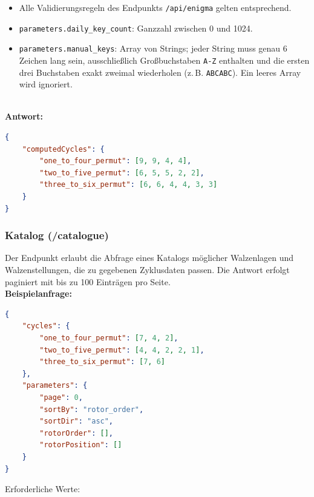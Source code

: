 \documentclass[12pt, ngerman, a4paper, numbers=noenddot]{article}
\begin{document}
\begin{itemize}
	\item Alle Validierungsregeln des Endpunkts \lstinline|/api/enigma| gelten entsprechend.
	\item \lstinline|parameters.daily_key_count|: Ganzzahl zwischen 0 und 1024.
	\item \lstinline|parameters.manual_keys|: Array von Strings; jeder String muss genau 6 Zeichen lang sein, ausschließlich Großbuchstaben \lstinline|A-Z| enthalten und die ersten drei Buchstaben exakt zweimal wiederholen (z.\,B. \lstinline|ABCABC|). Ein leeres Array wird ignoriert.
\end{itemize}
\ \\
\textbf{Antwort:}
\begin{lstlisting}[language=json, caption={Antwort auf /cyclometer-Anfrage}]
{
	"computedCycles": {
		"one_to_four_permut": [9, 9, 4, 4],
		"two_to_five_permut": [6, 5, 5, 2, 2],
		"three_to_six_permut": [6, 6, 4, 4, 3, 3]
	}
}
\end{lstlisting}



\subsubsection{Katalog (/catalogue)}

Der Endpunkt erlaubt die Abfrage eines Katalogs möglicher Walzenlagen und Walzenstellungen, die zu gegebenen Zyklusdaten passen. Die Antwort erfolgt paginiert mit bis zu 100 Einträgen pro Seite.
\ \\
\textbf{Beispielanfrage:}
\begin{lstlisting}[language=json, caption={Gültige Anfrage an /catalogue}]
{
	"cycles": {
		"one_to_four_permut": [7, 4, 2],
		"two_to_five_permut": [4, 4, 2, 2, 1],
		"three_to_six_permut": [7, 6]
	},
	"parameters": {
		"page": 0,
		"sortBy": "rotor_order",
		"sortDir": "asc",
		"rotorOrder": [],
		"rotorPosition": []
	}
}
\end{lstlisting}
Erforderliche Werte:
\end{document}
